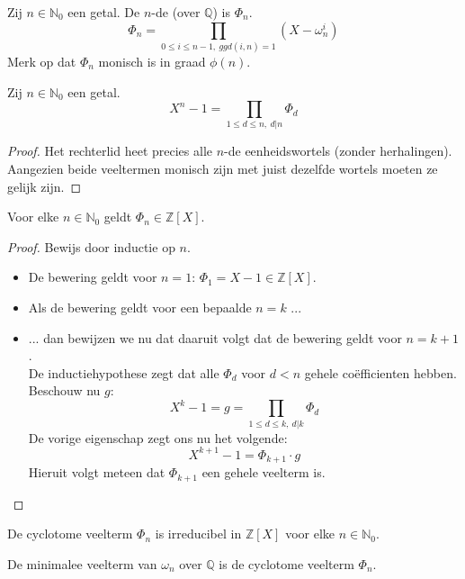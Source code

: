 \documentclass[main.tex]{subfiles}
\begin{document}
\begin{de}
  Zij $n\in \mathbb{N}_{0}$ een getal.
  De $n$-de  (over $\mathbb{Q}$) is $\Phi_{n}$.
  \[ \Phi_{n} = \prod_{0\le i \le n-1,\ ggd(i,n)= 1}(X-\omega_{n}^{i})\]
  Merk op dat $\Phi_{n}$ monisch is in graad $\phi(n)$.
\end{de}

\begin{ei}
  \label{ei:formule-n-degraads-eenheidsveelterm}
  Zij $n\in \mathbb{N}_{0}$ een getal.
  \[ X^{n}-1 = \prod_{1\le d\le n,\ d|n}\Phi_{d} \]
  \begin{proof}
    Het rechterlid heet precies alle $n$-de eenheidswortels (zonder herhalingen).\waarom
    Aangezien beide veeltermen monisch zijn met juist dezelfde wortels moeten ze gelijk zijn.
  \end{proof}
\end{ei}

\begin{pr}
  Voor elke $n\in \mathbb{N}_{0}$ geldt $\Phi_{n} \in \mathbb{Z}[X]$.

  \begin{proof}
    Bewijs door inductie op $n$.
    \begin{itemize}
    \item De bewering geldt voor $n=1$: $\Phi_{1} = X-1 \in \mathbb{Z}[X]$. 
    \item Als de bewering geldt voor een bepaalde $n=k$ ...
    \item ... dan bewijzen we nu dat daaruit volgt dat de bewering geldt voor $n=k+1$.\\
      De inductiehypothese zegt dat alle $\Phi_{d}$ voor $d<n$ gehele co\"efficienten hebben.
      Beschouw nu $g$:
      \[ X^{k}-1 = g = \prod_{1\le d\le k,\ d|k}\Phi_{d}\]
      De vorige eigenschap zegt ons nu het volgende:
      \[ X^{k+1}-1 = \Phi_{k+1}\cdot g\]
      Hieruit volgt meteen dat $\Phi_{k+1}$ een gehele veelterm is.
    \end{itemize}
  \end{proof}
\end{pr}

\begin{st}
  De cyclotome veelterm $\Phi_{n}$ is irreducibel in $\mathbb{Z}[X]$ voor elke $n\in \mathbb{N}_{0}$.
  \zb
\end{st}

\begin{gev}
  De minimalee veelterm van $\omega_{n}$ over $\mathbb{Q}$ is de cyclotome veelterm $\Phi_{n}$.
\end{gev}
\end{document}

